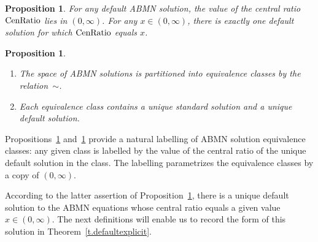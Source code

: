 \documentclass[letterpaper,11pt,oneside,reqno]{amsbook}
\numberwithin{figure}{chapter}
\newtheorem{proposition}[theorem]{Proposition}
\theoremstyle{definition}
\theoremstyle{definition}
\theoremstyle{definition}
\theoremstyle{definition}
\theoremstyle{definition}
\newcommand{\centralratio}{{\rm CenRatio}}
\newcommand{\abmnmacspace}{\textrm{ABMN} }
\begin{document}
\begin{proposition}\label{p.default}
For any default \abmnmacspace solution, the value of the central ratio  $\centralratio$ lies in $(0,\infty)$. For any $x \in (0,\infty)$, there is exactly one default solution for which $\centralratio$ equals $x$.
\end{proposition}
\begin{proposition}\label{p.abmnclassify}
\leavevmode
\begin{enumerate}
\item The space of \abmnmacspace solutions is partitioned into equivalence classes by the relation~$\sim$.
\item Each equivalence class contains 
a unique standard solution and 
a unique default solution.
\end{enumerate}
\end{proposition}
Propositions~\ref{p.default} and~\ref{p.abmnclassify} provide a natural labelling of \abmnmacspace solution equivalence classes: 
 any given class is labelled by the value of the central ratio of the unique default solution in the class. The labelling parametrizes the equivalence classes by a copy of $(0,\infty)$.

According to the latter assertion of Proposition~\ref{p.default}, there is a unique default solution to the \abmnmacspace equations whose central ratio equals a given value $x \in (0,\infty)$. The next definitions will enable us to record  the form of this solution in Theorem~\ref{t.defaultexplicit}.
\end{document}
